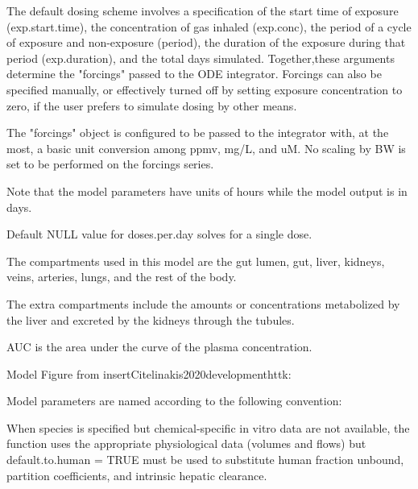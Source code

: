 \documentclass[a4paper]{book}
\begin{document}
\begin{Details}\relax
The default dosing scheme involves a specification of the start time
of exposure (exp.start.time), the concentration of gas inhaled (exp.conc),
the period of a cycle of exposure and non-exposure (period), the
duration of the exposure during that period (exp.duration), and the total
days simulated. Together,these arguments determine the "forcings" passed to
the ODE integrator. Forcings can also be specified manually, or effectively
turned off by setting exposure concentration to zero, if the user prefers to 
simulate dosing by other means. 

The "forcings" object is configured to be passed to the integrator with,
at the most, a basic unit conversion among ppmv, mg/L, and uM. No scaling by
BW is set to be performed on the forcings series.

Note that the model parameters have units of hours while the model output is
in days.

Default NULL value for doses.per.day solves for a single dose.

The compartments used in this model are the gut lumen, gut, liver, kidneys,
veins, arteries, lungs, and the rest of the body.

The extra compartments include the amounts or concentrations metabolized by
the liver and excreted by the kidneys through the tubules.

AUC is the area under the curve of the plasma concentration.

Model Figure from \bsl{}insertCitelinakis2020developmenthttk:


Model parameters are named according to the following convention:

When species is specified but chemical-specific in vitro data are not
available, the function uses the appropriate physiological data (volumes and 
flows) but default.to.human = TRUE must be used to substitute human
fraction unbound, partition coefficients, and intrinsic hepatic clearance.
\end{Details}
\end{document}
